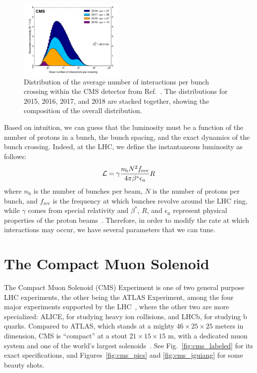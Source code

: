 \begin{figure}[!htb]
    \centering
    \includegraphics[width=0.45\textwidth]{fig/cms/pileup_run2.pdf}
    \caption[Distribution of the average number of interactions per bunch crossing within the CMS detector.]{
        Distribution of the average number of interactions per bunch crossing within the CMS detector from Ref.~\cite{CMSPublicLumi}. 
        The distributions for 2015, 2016, 2017, and 2018 are stacked together, showing the composition of the overall distribution.
    }
    \label{fig:pileup_run2}
\end{figure}

Based on intuition, we can guess that the luminosity must be a function of the number of protons in a bunch, the bunch spacing, and the exact dynamics of the bunch crossing. 
Indeed, at the LHC, we define the instantaneous luminosity as follows:
\begin{equation}
    \mathcal{L} = \gamma\frac{n_\mathrm{b}N^2f_\text{rev}}{4\pi\beta^{*}\epsilon_\mathrm{n}}R
\end{equation}
where $n_\mathrm{b}$ is the number of bunches per beam, $N$ is the number of protons per bunch, and $f_\text{rev}$ is the frequency at which bunches revolve around the LHC ring, while $\gamma$ comes from special relativity and $\beta^{*}$, $R$, and $\epsilon_\mathrm{n}$ represent physical properties of the proton beams~\cite{Aberle:2749422}. 
Therefore, in order to modify the rate at which interactions may occur, we have several parameters that we can tune.

\section{The Compact Muon Solenoid}\label{sec:cms}
The Compact Muon Solenoid (CMS) Experiment is one of two general purpose LHC experiments, the other being the ATLAS\footnotemark{} Experiment, among the four major experiments supported by the LHC~\cite{LHCWeb}, where the other two are more specialized: ALICE, for studying heavy ion collisions, and LHCb, for studying b quarks. 
Compared to ATLAS, which stands at a mighty $46\times25\times25$ meters in dimension, CMS is ``compact'' at a stout $21\times15\times15$ m, with a dedicated muon system and one of the world's largest solenoids~\cite{ATLASWeb, CMSWeb}. 
See Fig.~\ref{fig:cms_labeled} for its exact specifications, and Figures~\ref{fig:cms_pics} and \ref{fig:cms_jguiang} for some beauty shots. 

